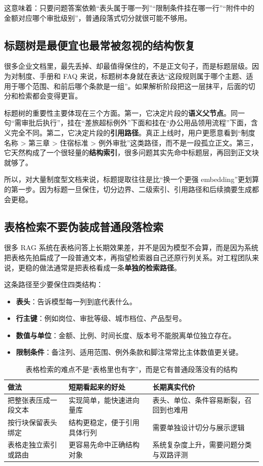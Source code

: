 这意味着：只要问题答案依赖“表头属于哪一列”“限制条件挂在哪一行”“附件中的金额对应哪个审批级别”，普通段落式切分就很可能不够用。

\subsection{标题树是最便宜也最常被忽视的结构恢复}
很多企业文档里，最先丢掉、却最值得保住的，不是正文句子，而是标题层级。因为对制度、手册和 FAQ 来说，标题树本身就在表达“这段规则属于哪个主题、适用于哪个范围、和前后哪个条款是一组”。如果解析阶段把这一层抹平，后面的切分和检索都会变得更盲。

标题树的重要性主要体现在三个方面。第一，它决定片段的\textbf{语义父节点}。同一句“需审批后执行”，挂在“差旅超标例外”下面和挂在“办公用品领用流程”下面，含义完全不同。第二，它决定片段的\textbf{引用路径}。真正上线时，用户更愿意看到“制度名称 > 第三章 > 住宿标准 > 例外审批”这类路径，而不是一段孤立正文。第三，它天然构成了一个很轻量的\textbf{结构索引}，很多问题其实先命中标题层，再回到正文块就够了。

所以，对大量制度型文档来说，标题提取往往是比“换一个更强 embedding”更划算的第一步。因为标题一旦保住，切分边界、二级索引、引用路径和后续摘要生成都会更稳。

\subsection{表格检索不要伪装成普通段落检索}
很多 RAG 系统在表格问答上长期效果差，并不是因为模型不会算，而是因为系统把表格先拍扁成了一段普通文本，再指望检索器自己还原行列关系。对工程团队来说，更稳的做法通常是把表格看成一条\textbf{单独的检索路径}。

这条路径至少要保住四类结构：
\begin{itemize}
  \item \textbf{表头}：告诉模型每一列到底代表什么。
  \item \textbf{行主键}：例如岗位、审批等级、城市档位、产品型号。
  \item \textbf{数值与单位}：金额、比例、时间长度、版本号不能脱离单位独立存在。
  \item \textbf{限制条件}：备注列、适用范围、例外条款和脚注常常比主体数值更关键。
\end{itemize}

\begin{table}[H]
\centering
\small
\begin{tabularx}{\textwidth}{>{\raggedright\arraybackslash}p{2.9cm}>{\raggedright\arraybackslash}p{3cm}>{\raggedright\arraybackslash}X}
\toprule
\textbf{做法} & \textbf{短期看起来的好处} & \textbf{长期真实代价} \\
\midrule
把整张表压成一段文本 & 实现简单，能快速进向量库 & 表头、单位、条件容易断裂，召回到也难用 \\
按行块保留表头绑定 & 结构更稳定，便于引用具体行列 & 需要单独设计切分与展示逻辑 \\
表格走独立索引或路由 & 更容易先命中正确结构对象 & 系统复杂度上升，需要问题分类与双路评测 \\
\bottomrule
\end{tabularx}
\caption{表格检索的难点不是“表格里也有字”，而是它有普通段落没有的结构}
\label{tab:table-retrieval-path}
\end{table}

